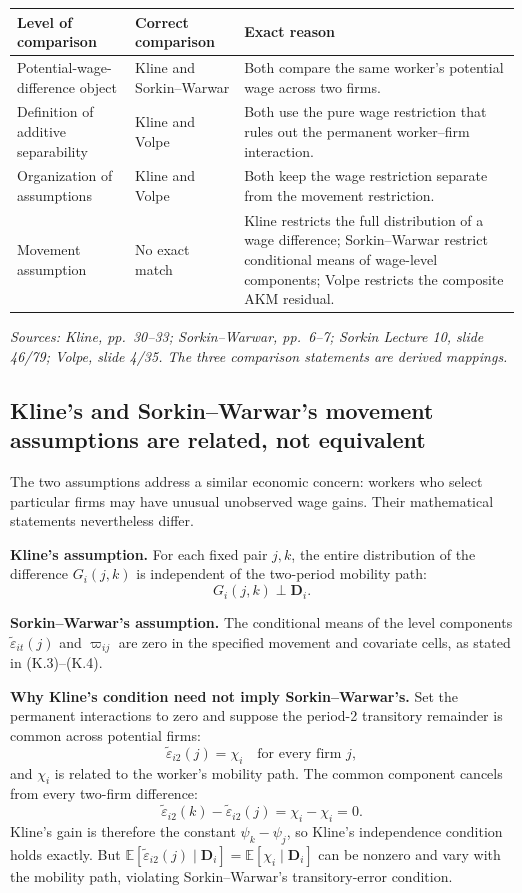 \documentclass[11pt]{article}
\begin{document}
\begin{longtable}{p{}p{}p{}}
\textbf{Level of comparison} & \textbf{Correct comparison} &
\textbf{Exact reason} \\
\hline
Potential-wage-difference object & Kline and Sorkin--Warwar & Both compare
the same worker's potential wage across two firms. \\
Definition of additive separability & Kline and Volpe & Both use the pure
wage restriction that rules out the permanent worker--firm interaction. \\
Organization of assumptions & Kline and Volpe & Both keep the wage
restriction separate from the movement restriction. \\
Movement assumption & No exact match & Kline restricts the full
distribution of a wage difference; Sorkin--Warwar restrict conditional means
of wage-level components; Volpe restricts the composite AKM residual. \\
\end{longtable}

\textit{Sources: Kline, pp.\ 30--33; Sorkin--Warwar, pp.\ 6--7;
Sorkin Lecture 10, slide 46/79; Volpe, slide 4/35.  The three comparison
statements are derived mappings.}

\subsection{Kline's and Sorkin--Warwar's movement assumptions are related,
not equivalent}

The two assumptions address a similar economic concern: workers who select
particular firms may have unusual unobserved wage gains.  Their mathematical
statements nevertheless differ.

\textbf{Kline's assumption.}
For each fixed pair \(j,k\), the entire distribution of the difference
\(G_i(j,k)\) is independent of the two-period mobility path:
\[
G_i(j,k)\perp\mathbf D_i.
\tag{K.14a}
\]

\textbf{Sorkin--Warwar's assumption.}
The conditional means of the level components
\(\widetilde\varepsilon_{it}(j)\) and \(\varpi_{ij}\) are zero in the
specified movement and covariate cells, as stated in (K.3)--(K.4).

\textbf{Why Kline's condition need not imply Sorkin--Warwar's.}
Set the permanent interactions to zero and suppose the period-2 transitory
remainder is common across potential firms:
\[
\widetilde\varepsilon_{i2}(j)=\chi_i
\quad\text{for every firm }j,
\tag{K.14b}
\]
and \(\chi_i\) is related to the worker's mobility path.  The common
component cancels from every two-firm difference:
\[
\widetilde\varepsilon_{i2}(k)
-\widetilde\varepsilon_{i2}(j)
=
\chi_i-\chi_i
=0.
\tag{K.14c}
\]
Kline's gain is therefore the constant \(\psi_k-\psi_j\), so Kline's
independence condition holds exactly.  But
\(\mathbb E[\widetilde\varepsilon_{i2}(j)\mid\mathbf D_i]
=\mathbb E[\chi_i\mid\mathbf D_i]\)
can be nonzero and vary with the mobility path, violating
Sorkin--Warwar's transitory-error condition.
\end{document}
